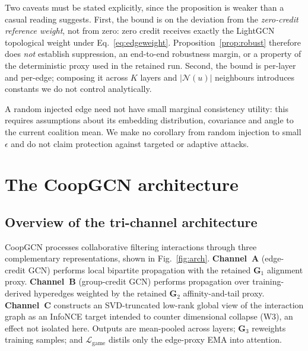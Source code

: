 \documentclass[a4paper,fleqn,longmktitle]{cas-dc}
\begin{document}
Two caveats must be stated explicitly, since the proposition is weaker than a
casual reading suggests. First, the bound is on the deviation from the
\emph{zero-credit reference weight}, not from zero: zero credit receives
exactly the LightGCN topological weight under Eq.~\eqref{eq:edgeweight}.
Proposition~\ref{prop:robust} therefore does \emph{not} establish suppression,
an end-to-end robustness margin, or a property of the deterministic proxy used
in the retained run. Second, the bound is per-layer and per-edge; composing it across
$K$ layers and $|\mathcal{N}(u)|$ neighbours introduces constants we do not
control analytically.

A random injected edge need not have small marginal consistency utility: this
requires assumptions about its embedding distribution, covariance and angle to
the current coalition mean. We make no corollary from random injection to
small $\epsilon$ and do not claim protection against targeted or adaptive
attacks.

\section{The CoopGCN architecture}
\label{sec:arch}

\subsection{Overview of the tri-channel architecture}
\label{sec:overview}

CoopGCN processes collaborative filtering interactions through three
complementary representations, shown in Fig.~\ref{fig:arch}. \textbf{Channel~A}
(edge-credit GCN) performs local bipartite propagation with the retained
$\mathbf G_1$ alignment proxy. \textbf{Channel~B} (group-credit GCN) performs
propagation over training-derived hyperedges weighted by the retained
$\mathbf G_2$ affinity-and-tail proxy.
\textbf{Channel~C} constructs an SVD-truncated low-rank global view of the
interaction graph as an InfoNCE target intended to counter dimensional
collapse (W3), an effect not isolated here. Outputs are mean-pooled across
layers; $\mathbf G_3$ reweights training samples; and
$\mathcal L_{\mathrm{game}}$ distils only the edge-proxy EMA into attention.
\end{document}
